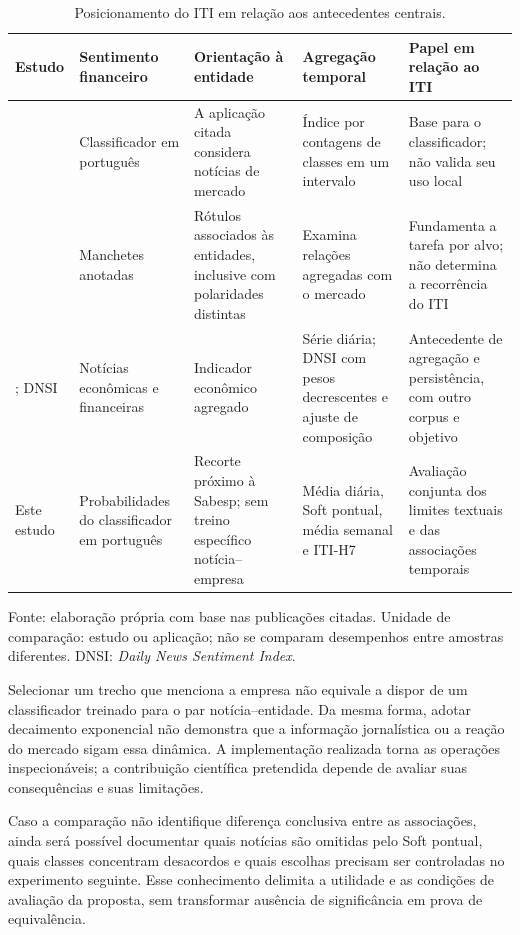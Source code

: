 \begin{table}[htbp]
\centering
\caption{Posicionamento do ITI em relação aos antecedentes centrais.}
\label{tab:posicionamento}
\begin{tabularx}{\textwidth}{@{}P{0.17\textwidth}L L L L@{}}
\toprule
Estudo & Sentimento financeiro & Orientação à entidade & Agregação temporal & Papel em relação ao ITI \\
\midrule
{} & Classificador em português & A aplicação citada considera notícias de mercado & Índice por contagens de classes em um intervalo & Base para o classificador; não valida seu uso local \\
 & Manchetes anotadas & Rótulos associados às entidades, inclusive com polaridades distintas & Examina relações agregadas com o mercado & Fundamenta a tarefa por alvo; não determina a recorrência do ITI \\
; DNSI \cite{frbsfNewsSentiment} & Notícias econômicas e financeiras & Indicador econômico agregado & Série diária; DNSI com pesos decrescentes e ajuste de composição & Antecedente de agregação e persistência, com outro corpus e objetivo \\
Este estudo & Probabilidades do classificador em português & Recorte próximo à Sabesp; sem treino específico notícia--empresa & Média diária, Soft pontual, média semanal e ITI-H7 & Avaliação conjunta dos limites textuais e das associações temporais \\
\bottomrule
\end{tabularx}
\vspace{0.4em}
{\footnotesize Fonte: elaboração própria com base nas publicações citadas. Unidade de comparação: estudo ou aplicação; não se comparam desempenhos entre amostras diferentes. DNSI: \emph{Daily News Sentiment Index}.}
\end{table}

Selecionar um trecho que menciona a empresa não equivale a dispor de um classificador treinado para o par notícia--entidade. Da mesma forma, adotar decaimento exponencial não demonstra que a informação jornalística ou a reação do mercado sigam essa dinâmica. A implementação realizada torna as operações inspecionáveis; a contribuição científica pretendida depende de avaliar suas consequências e suas limitações.

Caso a comparação não identifique diferença conclusiva entre as associações, ainda será possível documentar quais notícias são omitidas pelo Soft pontual, quais classes concentram desacordos e quais escolhas precisam ser controladas no experimento seguinte. Esse conhecimento delimita a utilidade e as condições de avaliação da proposta, sem transformar ausência de significância em prova de equivalência.
